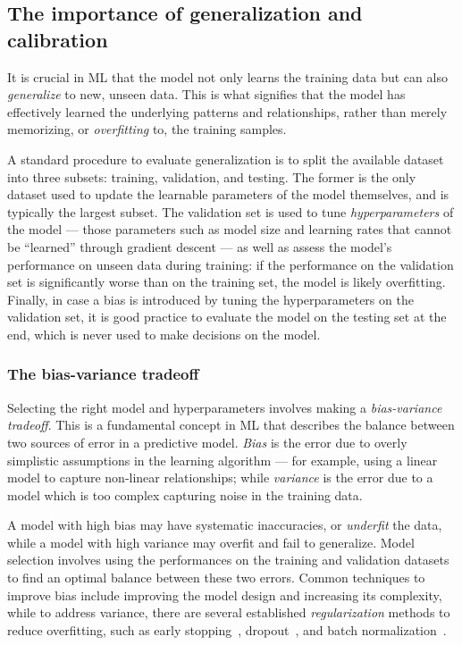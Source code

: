 \subsection{The importance of generalization and calibration}
\label{sec:03_ml_calibration}

It is crucial in ML that the model not only learns the training data but can also \textit{generalize} to new, unseen data.
This is what signifies that the model has effectively learned the underlying patterns and relationships, rather than merely memorizing, or \textit{overfitting} to, the training samples.

A standard procedure to evaluate generalization is to split the available dataset into three subsets: training, validation, and testing.
The former is the only dataset used to update the learnable parameters of the model themselves, and is typically the largest subset.
The validation set is used to tune \textit{hyperparameters} of the model --- those parameters such as model size and learning rates that cannot be ``learned'' through gradient descent --- as well as assess the model's performance on unseen data during training: if the performance on the validation set is significantly worse than on the training set, the model is likely overfitting.
Finally, in case a bias is introduced by tuning the hyperparameters on the validation set, it is good practice to evaluate the model on the testing set at the end, which is never used to make decisions on the model.

\subsubsection{The bias-variance tradeoff}

Selecting the right model and hyperparameters involves making a \textit{bias-variance tradeoff}.
This is a fundamental concept in ML that describes the balance between two sources of error in a predictive model.
\textit{Bias} is the error due to overly simplistic assumptions in the learning algorithm --- for example, using a linear model to capture non-linear relationships; while \textit{variance} is the error due to a model which is too complex capturing noise in the training data.

A model with high bias may have systematic inaccuracies, or \textit{underfit} the data, while a model with high variance may overfit and fail to generalize.
Model selection involves using the performances on the training and validation datasets to find an optimal balance between these two errors.
Common techniques to improve bias include improving the model design and increasing its complexity, while to address variance, there are several established \textit{regularization} methods to reduce overfitting, such as early stopping~\cite{prechelt2012early}, dropout~\cite{srivastava2014dropout}, and batch normalization~\cite{ioffe2015batch}.


